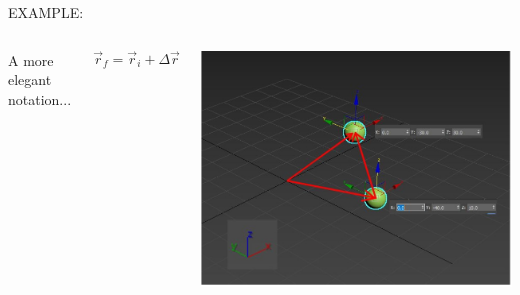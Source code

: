 \documentclass[]{beamer}
\begin{document}
  \begin{frame}
  
  
  EXAMPLE:
  
  
  
  
  
  
  
  \begin{columns}
  
  A more elegant notation...
  
  \begin{equation}
  \vec{r}_f=\vec{r}_i+\Delta \vec{ r}
  \end{equation}
  
  
  
  \begin{center}
       \includegraphics[width=1.1\textwidth]{images/exampleVS5.jpg}      
       \end{center}
  
  
  \end{columns}
  
  
  
  
   \end{frame}
  
  
\end{document}
